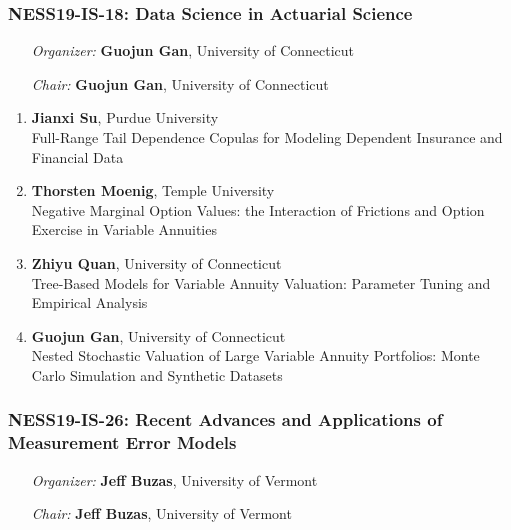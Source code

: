 \subsubsection*{NESS19-IS-18: Data Science in Actuarial Science}

\begin{enumerate}[align=left]
\item [\emph{Organizer:}] \textbf{Guojun Gan}, University of Connecticut \\
\item [\emph{Chair:}] \textbf{Guojun Gan}, University of Connecticut
\end{enumerate}

\begin{enumerate}
\item \textbf{Jianxi Su}, Purdue University \\
Full-Range Tail Dependence Copulas for Modeling Dependent Insurance and Financial Data
\item \textbf{Thorsten Moenig}, Temple University \\
Negative Marginal Option Values:  the Interaction of Frictions and Option Exercise in Variable Annuities
\item \textbf{Zhiyu Quan}, University of Connecticut \\
Tree-Based Models for Variable Annuity Valuation: Parameter Tuning and Empirical Analysis
\item \textbf{Guojun Gan}, University of Connecticut \\
Nested Stochastic Valuation of Large Variable Annuity Portfolios: Monte Carlo Simulation and Synthetic Datasets
\end{enumerate}

\subsubsection*{NESS19-IS-26: Recent Advances and Applications of Measurement Error Models}

\begin{enumerate}[align=left]
\item [\emph{Organizer:}] \textbf{Jeff Buzas}, University of Vermont \\
\item [\emph{Chair:}] \textbf{Jeff Buzas}, University of Vermont
\end{enumerate}

